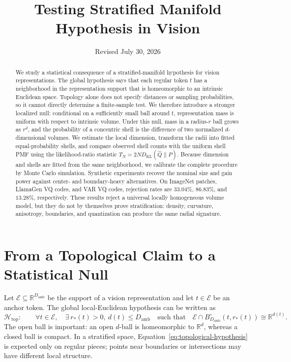 \documentclass[11pt]{article}
\title{\vspace{-1.2em}Testing Stratified Manifold Hypothesis in Vision}
\author{}
\date{Revised July 30, 2026}
\newcommand{\R}{\mathbb{R}}
\newcommand{\Ball}{B}
\newcommand{\KL}{D_{\mathrm{KL}}}
\begin{document}
\maketitle

\begin{abstract}
We study a statistical consequence of a stratified-manifold hypothesis for
vision representations. The global hypothesis says that each regular token
$t$ has a neighborhood in the representation support that is homeomorphic to
an intrinsic Euclidean space. Topology alone does not specify distances or
sampling probabilities, so it cannot directly determine a finite-sample test.
We therefore introduce a stronger localized null: conditional on a sufficiently
small ball around $t$, representation mass is uniform with respect to intrinsic
volume. Under this null, mass in a radius-$r$ ball grows as $r^d$, and the
probability of a concentric shell is the difference of two normalized
$d$-dimensional volumes. We estimate the local dimension, transform the radii
into fitted equal-probability shells, and compare observed shell counts with the
uniform shell PMF using the likelihood-ratio statistic
$T_N=2N\KL(\widehat Q\|P)$. Because dimension and shells are fitted from the
same neighborhood, we calibrate the complete procedure by Monte Carlo
simulation. Synthetic experiments recover the nominal size and gain power
against center- and boundary-heavy alternatives. On ImageNet patches, LlamaGen
VQ codes, and VAR VQ codes, rejection rates are $33.04\%$, $86.83\%$, and
$13.28\%$, respectively. These results reject a universal locally homogeneous
volume model, but they do not by themselves prove stratification: density,
curvature, anisotropy, boundaries, and quantization can produce the same radial
signature.
\end{abstract}

\section{From a Topological Claim to a Statistical Null}

Let $\mathcal E\subseteq\R^{D_{\mathrm{amb}}}$ be the support of a vision
representation and let $t\in\mathcal E$ be an anchor token. The global
local-Euclidean hypothesis can be written as
\begin{equation}
  \mathcal H_{\mathrm{top}}:\qquad
  \forall t\in\mathcal E,\quad
  \exists\ r_\ast(t)>0,\ d(t)\le D_{\mathrm{amb}}
  \quad\text{such that}\quad
  \mathcal E\cap \Ball^\circ_{D_{\mathrm{amb}}}(t,r_\ast(t))
  \cong \R^{d(t)}.
  \label{eq:topological-hypothesis}
\end{equation}
The open ball is important: an open $d$-ball is homeomorphic to $\R^d$,
whereas a closed ball is compact. In a stratified space,
Equation~\eqref{eq:topological-hypothesis} is expected only on regular pieces;
points near boundaries or intersections may have different local structure.
\end{document}
